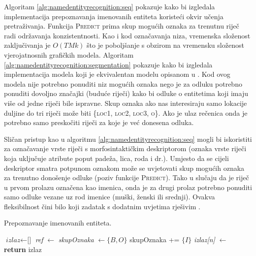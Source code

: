 Algoritam \ref{alg:namedentityrecognition:seq} pokazuje kako bi izgledala
implementacija prepoznavanja imenovanih entiteta koristeći okvir učenja
pretraživanja. Funkcija \textsc{Predict} prima skup mogućih oznaka za trenutnu
riječ radi održavanja konzistentnosti. Kao i kod označavanja niza, vremenska
složenost zaključivanja je $O(T M k)$ što je poboljšanje s obzirom na vremensku
složenost vjerojatnosnih grafičkih modela. Algoritam
\ref{alg:namedentityrecognition:segmentation} pokazuje kako bi izgledala
implementacija modela koji je ekvivalentan modelu opisanom u
\citep{sarawagi2004semi}. Kod ovog modela nije potrebno ponuditi niz mogućih
oznaka nego je za odluku potrebno ponuditi dovoljno značajki (buduće riječi)
kako bi odluke o entitetima koji imaju više od jedne riječi bile ispravne. Skup
oznaka ako nas interesiraju samo lokacije duljine do tri riječi može biti
\{\textsc{loc1}, \textsc{loc2}, \textsc{loc3}, \textsc{o}\}. Ako je ulaz
rečenica onda je potrebno samo preskočiti riječi za koje je već donesena odluka.

Sličan pristup kao u algoritmu \ref{alg:namedentityrecognition:seq} mogli bi
iskoristiti za označavanje vrste riječi s morfosintaktičkim deskriptorom (oznaka
vrste riječi koja uključuje atribute poput padeža, lica, roda i dr.). Umjesto da
se cijeli deskriptor smatra potpunom oznakom može se uvjetovati skup mogućih
oznaka za trenutno donošenje odluke (poziv funkcije \textsc{Predict}). Tako u
slučaju da je riječ u prvom prolazu označena kao imenica, onda je za drugi
prolaz potrebno ponuditi samo odluke vezane uz rod imenice (muški, ženski ili
srednji). Ovakva fleksibilnost čini bilo koji zadatak s dodatnim uvjetima
 rješivim \citep{chang2012structured}.

\begin{algorithm}[H]
\caption{Prepoznavanje imenovanih entiteta.}
\label{alg:namedentityrecognition:seq}
\begin{algorithmic}[1]
\State $\textit{izlaz} \gets \text{[]}$
  \State \textit{ref} $\gets$ 
  \State \textit{skupOznaka} $\gets \{B,O\}$
    \State skupOznaka += $\{I\}$
  \EndIf
  \State \textit{izlaz[n]} $\gets$ 
\EndFor
\State {}
\State \textbf{return} izlaz
\EndFunction
\end{algorithmic}
\end{algorithm}

